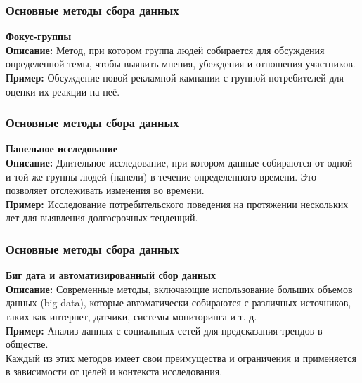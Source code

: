 \documentclass[aspectratio=169]{beamer}
\begin{document}
\begin{frame}
\frametitle{Основные методы сбора данных}
\textbf{Фокус-группы}
\newline\\
\textbf{Описание:} Метод, при котором группа людей собирается для обсуждения определенной темы, чтобы выявить мнения, убеждения и отношения участников.
\newline\\
\textbf{Пример:} Обсуждение новой рекламной кампании с группой потребителей для оценки их реакции на неё.
\end{frame}

\begin{frame}
\frametitle{Основные методы сбора данных}
\textbf{Панельное исследование}
\newline\\
\textbf{Описание:} Длительное исследование, при котором данные собираются от одной и той же группы людей (панели) в течение определенного времени. Это позволяет отслеживать изменения во времени.
\newline\\
\textbf{Пример:} Исследование потребительского поведения на протяжении нескольких лет для выявления долгосрочных тенденций.
\end{frame}

\begin{frame}
\frametitle{Основные методы сбора данных}
\textbf{Биг дата и автоматизированный сбор данных}
\newline\\
\textbf{Описание:} Современные методы, включающие использование больших объемов данных (big data), которые автоматически собираются с различных источников, таких как интернет, датчики, системы мониторинга и т. д.
\newline\\
\textbf{Пример:} Анализ данных с социальных сетей для предсказания трендов в обществе.
\newline\\
Каждый из этих методов имеет свои преимущества и ограничения и применяется в зависимости от целей и контекста исследования.
\end{frame}
\end{document}
